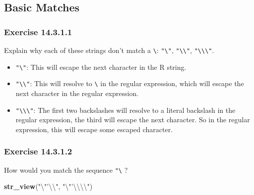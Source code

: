 \documentclass[]{book}
\newenvironment{Shaded}{\begin{snugshade}}{\end{snugshade}}
\newcommand{\CharTok}[1]{\textcolor[rgb]{0.31,0.60,0.02}{#1}}
\newcommand{\KeywordTok}[1]{\textcolor[rgb]{0.13,0.29,0.53}{\textbf{#1}}}
\newcommand{\NormalTok}[1]{#1}
\newcommand{\StringTok}[1]{\textcolor[rgb]{0.31,0.60,0.02}{#1}}
\providecommand{\tightlist}{%
  \setlength{\itemsep}{0pt}\setlength{\parskip}{0pt}}
\theoremstyle{plain}
\theoremstyle{remark}
\begin{document}
\hypertarget{basic-matches}{%
\subsection{Basic Matches}\label{basic-matches}}

\hypertarget{exercise-14.3.1.1}{%
\subsubsection*{\texorpdfstring{Exercise
{14.3.1.1}}{Exercise 14.3.1.1}}\label{exercise-14.3.1.1}}

Explain why each of these strings don't match a
\texttt{\textbackslash{}}: \texttt{"\textbackslash{}"},
\texttt{"\textbackslash{}\textbackslash{}"},
\texttt{"\textbackslash{}\textbackslash{}\textbackslash{}"}.

\begin{itemize}
\tightlist
\item
  \texttt{"\textbackslash{}"}: This will escape the next character in
  the R string.
\item
  \texttt{"\textbackslash{}\textbackslash{}"}: This will resolve to
  \texttt{\textbackslash{}} in the regular expression, which will escape
  the next character in the regular expression.
\item
  \texttt{"\textbackslash{}\textbackslash{}\textbackslash{}"}: The first
  two backslashes will resolve to a literal backslash in the regular
  expression, the third will escape the next character. So in the
  regular expression, this will escape some escaped character.
\end{itemize}

\hypertarget{exercise-14.3.1.2}{%
\subsubsection*{\texorpdfstring{Exercise
{14.3.1.2}}{Exercise 14.3.1.2}}\label{exercise-14.3.1.2}}

How would you match the sequence
\texttt{"\textquotesingle{}\textbackslash{}} ?

\begin{Shaded}
\begin{Highlighting}[]
\KeywordTok{str_view}\NormalTok{(}\StringTok{"}\CharTok{\textbackslash{}"}\StringTok{'}\CharTok{\textbackslash{}\textbackslash{}}\StringTok{"}\NormalTok{, }\StringTok{"}\CharTok{\textbackslash{}"}\StringTok{'}\CharTok{\textbackslash{}\textbackslash{}\textbackslash{}\textbackslash{}}\StringTok{"}\NormalTok{)}
\end{Highlighting}
\end{Shaded}
\end{document}
